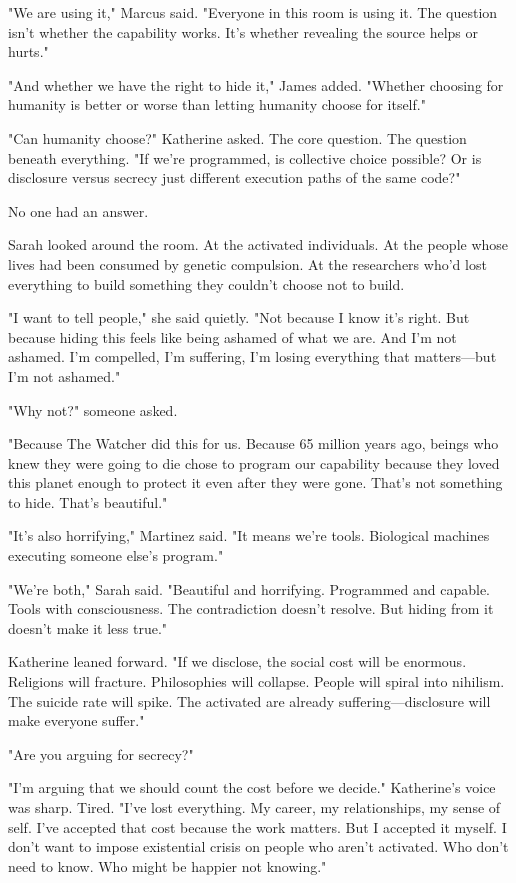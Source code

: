 "We are using it," Marcus said. "Everyone in this room is using it. The question isn't whether the capability works. It's whether revealing the source helps or hurts."

"And whether we have the right to hide it," James added. "Whether choosing for humanity is better or worse than letting humanity choose for itself."

"Can humanity choose?" Katherine asked. The core question. The question beneath everything. "If we're programmed, is collective choice possible? Or is disclosure versus secrecy just different execution paths of the same code?"

No one had an answer.

Sarah looked around the room. At the activated individuals. At the people whose lives had been consumed by genetic compulsion. At the researchers who'd lost everything to build something they couldn't choose not to build.

"I want to tell people," she said quietly. "Not because I know it's right. But because hiding this feels like being ashamed of what we are. And I'm not ashamed. I'm compelled, I'm suffering, I'm losing everything that matters—but I'm not ashamed."

"Why not?" someone asked.

"Because The Watcher did this for us. Because 65 million years ago, beings who knew they were going to die chose to program our capability because they loved this planet enough to protect it even after they were gone. That's not something to hide. That's beautiful."

"It's also horrifying," Martinez said. "It means we're tools. Biological machines executing someone else's program."

"We're both," Sarah said. "Beautiful and horrifying. Programmed and capable. Tools with consciousness. The contradiction doesn't resolve. But hiding from it doesn't make it less true."

Katherine leaned forward. "If we disclose, the social cost will be enormous. Religions will fracture. Philosophies will collapse. People will spiral into nihilism. The suicide rate will spike. The activated are already suffering—disclosure will make everyone suffer."

"Are you arguing for secrecy?"

"I'm arguing that we should count the cost before we decide." Katherine's voice was sharp. Tired. "I've lost everything. My career, my relationships, my sense of self. I've accepted that cost because the work matters. But I accepted it myself. I don't want to impose existential crisis on people who aren't activated. Who don't need to know. Who might be happier not knowing."

